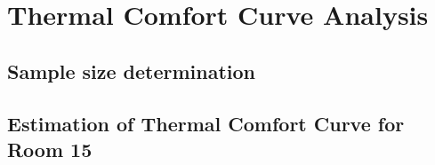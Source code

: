 \chapter{Thermal Comfort Curve Analysis}
\section{Sample size determination}





\section{Estimation of Thermal Comfort Curve for Room 15}